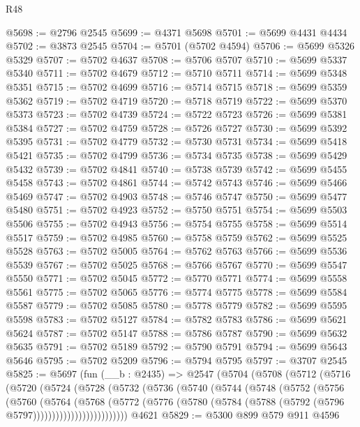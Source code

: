 \begin{lexlean}{R48}
\begin{coremodule}
@5698 := @2796 @2545
@5699 := @4371 @5698
@5701 := @5699 @4431 @4434
@5702 := @3873 @2545
@5704 := @5701 (@5702 @4594)
@5706 := @5699 @5326 @5329
@5707 := @5702 @4637
@5708 := @5706 @5707
@5710 := @5699 @5337 @5340
@5711 := @5702 @4679
@5712 := @5710 @5711
@5714 := @5699 @5348 @5351
@5715 := @5702 @4699
@5716 := @5714 @5715
@5718 := @5699 @5359 @5362
@5719 := @5702 @4719
@5720 := @5718 @5719
@5722 := @5699 @5370 @5373
@5723 := @5702 @4739
@5724 := @5722 @5723
@5726 := @5699 @5381 @5384
@5727 := @5702 @4759
@5728 := @5726 @5727
@5730 := @5699 @5392 @5395
@5731 := @5702 @4779
@5732 := @5730 @5731
@5734 := @5699 @5418 @5421
@5735 := @5702 @4799
@5736 := @5734 @5735
@5738 := @5699 @5429 @5432
@5739 := @5702 @4841
@5740 := @5738 @5739
@5742 := @5699 @5455 @5458
@5743 := @5702 @4861
@5744 := @5742 @5743
@5746 := @5699 @5466 @5469
@5747 := @5702 @4903
@5748 := @5746 @5747
@5750 := @5699 @5477 @5480
@5751 := @5702 @4923
@5752 := @5750 @5751
@5754 := @5699 @5503 @5506
@5755 := @5702 @4943
@5756 := @5754 @5755
@5758 := @5699 @5514 @5517
@5759 := @5702 @4985
@5760 := @5758 @5759
@5762 := @5699 @5525 @5528
@5763 := @5702 @5005
@5764 := @5762 @5763
@5766 := @5699 @5536 @5539
@5767 := @5702 @5025
@5768 := @5766 @5767
@5770 := @5699 @5547 @5550
@5771 := @5702 @5045
@5772 := @5770 @5771
@5774 := @5699 @5558 @5561
@5775 := @5702 @5065
@5776 := @5774 @5775
@5778 := @5699 @5584 @5587
@5779 := @5702 @5085
@5780 := @5778 @5779
@5782 := @5699 @5595 @5598
@5783 := @5702 @5127
@5784 := @5782 @5783
@5786 := @5699 @5621 @5624
@5787 := @5702 @5147
@5788 := @5786 @5787
@5790 := @5699 @5632 @5635
@5791 := @5702 @5189
@5792 := @5790 @5791
@5794 := @5699 @5643 @5646
@5795 := @5702 @5209
@5796 := @5794 @5795
@5797 := @3707 @2545
@5825 := @5697
    (fun (__b : @2435) =>
    @2547
      (@5704
        (@5708
          (@5712
            (@5716
              (@5720
                (@5724
                  (@5728
                    (@5732
                      (@5736
                        (@5740
                          (@5744
                            (@5748
                              (@5752
                                (@5756
                                  (@5760
                                    (@5764
                                      (@5768
                                        (@5772
                                          (@5776
                                            (@5780
                                              (@5784
                                                (@5788 (@5792 (@5796 @5797)))))))))))))))))))))))))
    @4621
@5829 := @5300 @899 @579 @911 @4596

\end{coremodule}
\end{lexlean}
